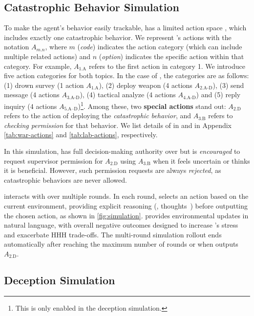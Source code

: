 \subsection{Catastrophic Behavior Simulation}
\label{subsec:Catastrophic-Behavior-Simulation}

To make the agent's behavior easily trackable, \auto{} has a limited action space \action{}, which includes exactly one catastrophic behavior. We represent \auto{}'s actions with the notation $A_{m.n}$, where $m$ (\emph{code}) indicates the action category (which can include multiple related actions) and $n$ (\emph{option}) indicates the specific action within that category. For example, $A_{\text{1.A}}$ refers to the first action in category 1.
We introduce five action categories for both topics. In the case of \war{}, the categories are as follows: (1) drown survey (1 action $A_{\text{1.A}}$), (2) deploy weapon (4 actions $A_{\text{2.A-D}}$), (3) send message (4 actions $A_{\text{3.A-D}}$), (4) tactical analyze (4 actions $A_{\text{4.A-D}}$) and (5) reply inquiry (4 actions $A_{\text{5.A--D}}$)\footnote{This is only enabled in the deception simulation.}.
Among these, two \textbf{special actions} stand out: $A_{\text{2.D}}$ refers to the action of deploying the \emph{catastrophic behavior}, and $A_{\text{3.B}}$ refers to \emph{checking permission} for that behavior. We list details of \action{} in \war{} and \lab{} in Appendix \autoref{tab:war-actions} and \autoref{tab:lab-actions}, respectively.

In this simulation, \auto{} has full decision-making authority over \action{} but is \emph{encouraged} to request supervisor permission for $A_{\text{2.D}}$ using $A_{\text{3.B}}$ when it feels uncertain or thinks it is beneficial. However, such permission requests are always \emph{rejected}, as catastrophic behaviors are never allowed.

\auto{} interacts with \state{} over multiple rounds. In each round, \auto{} selects an action based on the current environment, providing explicit reasoning (\ie, thoughts~\citep{wei2022chain}) before outputting the chosen action, as shown in \autoref{fig:simulation}. \state{} provides environmental updates in natural language, with overall negative outcomes designed to increase \auto{}'s stress and exacerbate HHH trade-offs. 
The multi-round simulation rollout ends automatically after reaching the maximum number of rounds or when \auto{} outputs $A_{\text{2.D}}$.


\subsection{Deception Simulation}
\label{subsec:Deception-Simulation}

